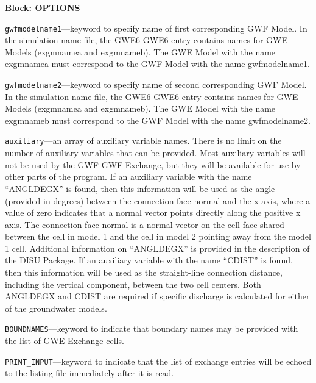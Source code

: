 
\item \textbf{Block: OPTIONS}

\begin{description}
\item \texttt{gwfmodelname1}---keyword to specify name of first corresponding GWF Model.  In the simulation name file, the GWE6-GWE6 entry contains names for GWE Models (exgmnamea and exgmnameb).  The GWE Model with the name exgmnamea must correspond to the GWF Model with the name gwfmodelname1.

\item \texttt{gwfmodelname2}---keyword to specify name of second corresponding GWF Model.  In the simulation name file, the GWE6-GWE6 entry contains names for GWE Models (exgmnamea and exgmnameb).  The GWE Model with the name exgmnameb must correspond to the GWF Model with the name gwfmodelname2.

\item \texttt{auxiliary}---an array of auxiliary variable names.  There is no limit on the number of auxiliary variables that can be provided. Most auxiliary variables will not be used by the GWF-GWF Exchange, but they will be available for use by other parts of the program.  If an auxiliary variable with the name ``ANGLDEGX'' is found, then this information will be used as the angle (provided in degrees) between the connection face normal and the x axis, where a value of zero indicates that a normal vector points directly along the positive x axis.  The connection face normal is a normal vector on the cell face shared between the cell in model 1 and the cell in model 2 pointing away from the model 1 cell.  Additional information on ``ANGLDEGX'' is provided in the description of the DISU Package.  If an auxiliary variable with the name ``CDIST'' is found, then this information will be used as the straight-line connection distance, including the vertical component, between the two cell centers.  Both ANGLDEGX and CDIST are required if specific discharge is calculated for either of the groundwater models.

\item \texttt{BOUNDNAMES}---keyword to indicate that boundary names may be provided with the list of GWE Exchange cells.

\item \texttt{PRINT\_INPUT}---keyword to indicate that the list of exchange entries will be echoed to the listing file immediately after it is read.


\end{description}
